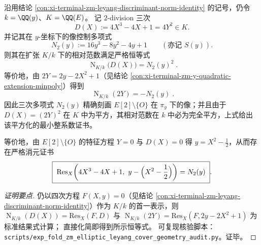 \begin{conclusion}\label{con:xi-terminal-zm-2division-norm-square}
沿用结论 \ref{con:xi-terminal-zm-leyang-discriminant-norm-identity} 的记号，仍令 \(k=\QQ(y)\)、\(K=\QQ(E)\)。
记 \(2\)-division 三次
\[
D(X):=4X^3-4X+1=4Y^2\in K.
\]
并记其在 \(y\)-坐标下的像控制多项式
\[
N_2(y):=16y^3-8y^2-4y+1\qquad(\text{亦记 }S(y)).
\]
则其在扩张 \(K/k\) 下的相对范数满足严格恒等式
\[
\boxed{\;
\operatorname{N}_{K/k}\bigl(D(X)\bigr)=N_2(y)^2\; }.
\]
等价地，由 \(2Y=2y-2X^2+1\)（见结论 \ref{con:xi-terminal-zm-y-quadratic-extension-minpoly}）得到
\[
\boxed{\;
\operatorname{N}_{K/k}(2Y)=-N_2(y)\; }.
\]
因此三次多项式 \(N_2(y)\) 精确刻画 \(E[2]\setminus\{O\}\) 在 \(\pi_y\) 下的像；并且由于 \(D(X)=(2Y)^2\) 在 \(K\) 中为平方，其相对范数在 \(k\) 中必为完全平方，上式给出该平方化的最小整系数证书。
\par
等价地，由 \(E[2]\setminus\{O\}\) 的特征方程 \(Y=0\) 与 \(D(X)=0\) 得 \(y=X^2-\tfrac12\)，从而存在严格消元证书
\[
\boxed{\;
\mathrm{Res}_X\!\left(4X^3-4X+1,\ y-\Bigl(X^2-\frac12\Bigr)\right)=N_2(y)\; }.
\]
\end{conclusion}
\begin{proof}[证明要点]
仍以四次方程 \(F(X,y)=0\)（见结论 \ref{con:xi-terminal-zm-leyang-discriminant-norm-identity}）作为 \(K/k\) 的首一表示，则
\(
\operatorname{N}_{K/k}(D(X))=\mathrm{Res}_X(F,D)
\)
与
\(
\operatorname{N}_{K/k}(2Y)=\mathrm{Res}_X(F,2y-2X^2+1)
\)
为标准结果式计算；
直接化简即得到所示恒等式。
可复现核验脚本：\texttt{scripts/exp\_fold\_zm\_elliptic\_leyang\_cover\_geometry\_audit.py}。证毕。
\end{proof}

